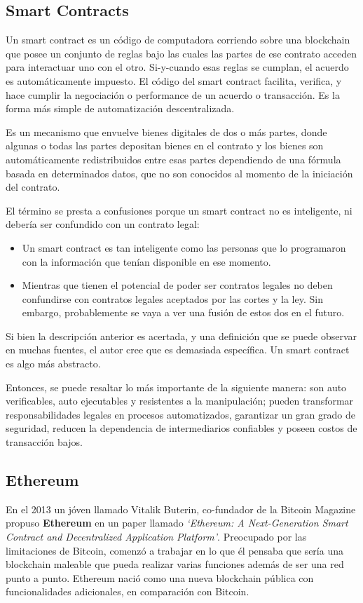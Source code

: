 \subsection{Smart Contracts}
Un smart contract es un código de computadora corriendo sobre una blockchain que posee un conjunto de reglas bajo las cuales las partes de ese contrato acceden para interactuar uno con el otro. Si-y-cuando esas reglas se cumplan, el acuerdo es automáticamente impuesto. El código del smart contract facilita, verifica, y hace cumplir la negociación o performance de un acuerdo o transacción. Es la forma más simple de automatización descentralizada.

Es un mecanismo que envuelve bienes digitales de dos o más partes, donde algunas o todas las partes depositan bienes en el contrato y los bienes son automáticamente redistribuidos entre esas partes dependiendo de una fórmula basada en determinados datos, que no son conocidos al momento de la iniciación del contrato. 

El término se presta a confusiones porque un smart contract no es inteligente, ni debería ser confundido con un contrato legal:
\begin{itemize}
    \item Un smart contract es tan inteligente como las personas que lo programaron con la información que tenían disponible en ese momento.
    \item Mientras que tienen el potencial de poder ser contratos legales no deben confundirse con contratos legales aceptados por las cortes y la ley. Sin embargo, probablemente se vaya a ver una fusión de estos dos en el futuro.
\end{itemize}

Si bien la descripción anterior es acertada, y una definición que se puede observar en muchas fuentes, el autor cree que es demasiada específica. Un smart contract es algo más abstracto.

Entonces, se puede resaltar lo más importante de la siguiente manera: son auto verificables, auto ejecutables y resistentes a la manipulación; pueden transformar responsabilidades legales en procesos automatizados, garantizar un gran grado de seguridad, reducen la dependencia de intermediarios confiables y poseen costos de transacción bajos. 


\subsection{Ethereum}
En el 2013 un jóven llamado Vitalik Buterin\cite{miethereumvitalik}, co-fundador de la Bitcoin Magazine propuso \textbf{Ethereum} en un paper llamado \textit{‘Ethereum: A Next-Generation Smart Contract and Decentralized Application Platform’}. Preocupado por las limitaciones de Bitcoin, comenzó a trabajar en lo que él pensaba que sería una blockchain maleable que pueda realizar varias funciones además de ser una red punto a punto. Ethereum\cite{101blockchainseth} nació como una nueva blockchain pública con funcionalidades adicionales, en comparación con Bitcoin.

